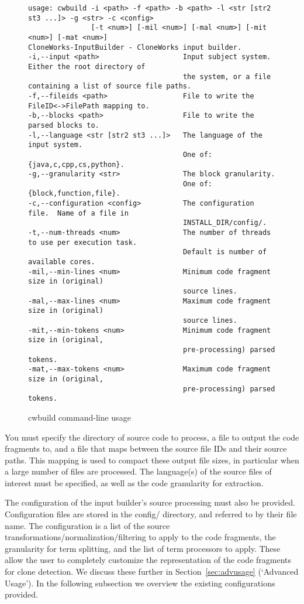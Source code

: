 \documentclass[]{article}
\begin{document}
	\begin{figure}
		\caption{cwbuild command-line usage} \label{fig:cwbuilduse}
		\begin{verbatim}
usage: cwbuild -i <path> -f <path> -b <path> -l <str [str2 st3 ...]> -g <str> -c <config> 
               [-t <num>] [-mil <num>] [-mal <num>] [-mit <num>] [-mat <num>]
CloneWorks-InputBuilder - CloneWorks input builder.
-i,--input <path>                    Input subject system.  Either the root directory of
                                     the system, or a file containing a list of source file paths.
-f,--fileids <path>                  File to write the FileID<->FilePath mapping to.
-b,--blocks <path>                   File to write the parsed blocks to.
-l,--language <str [str2 st3 ...]>   The language of the input system.
                                     One of: {java,c,cpp,cs,python}.
-g,--granularity <str>               The block granularity.
                                     One of: {block,function,file}.
-c,--configuration <config>          The configuration file.  Name of a file in
                                     INSTALL_DIR/config/.
-t,--num-threads <num>               The number of threads to use per execution task.   
                                     Default is number of available cores.
-mil,--min-lines <num>               Minimum code fragment size in (original)
                                     source lines.
-mal,--max-lines <num>               Maximum code fragment size in (original)
                                     source lines.
-mit,--min-tokens <num>              Minimum code fragment size in (original,
                                     pre-processing) parsed tokens.
-mat,--max-tokens <num>              Maximum code fragment size in (original,
                                     pre-processing) parsed tokens.
		\end{verbatim}
	\end{figure}
		
	You must specify the directory of source code to process, a file to output the code fragments to, and a file that maps between the source file IDs and their source paths.  This mapping is used to compact these output file sizes, in particular when a large number of files are processed.  The language(s) of the source files of interest must be specified, as well as the code granularity for extraction.
	
	The configuration of the input builder's source processing must also be provided.  Configuration files are stored in the config/ directory, and referred to by their file name.  The configuration is a list of the source transformations/normalization/filtering to apply to the code fragments, the granularity for term splitting, and the list of term processors to apply.  These allow the user to completely customize the representation of the code fragments for clone detection. We discuss these further in Section~\ref{sec:advusage} (`Advanced Usage').  In the following subsection we overview the existing configurations provided.
	
\end{document}
